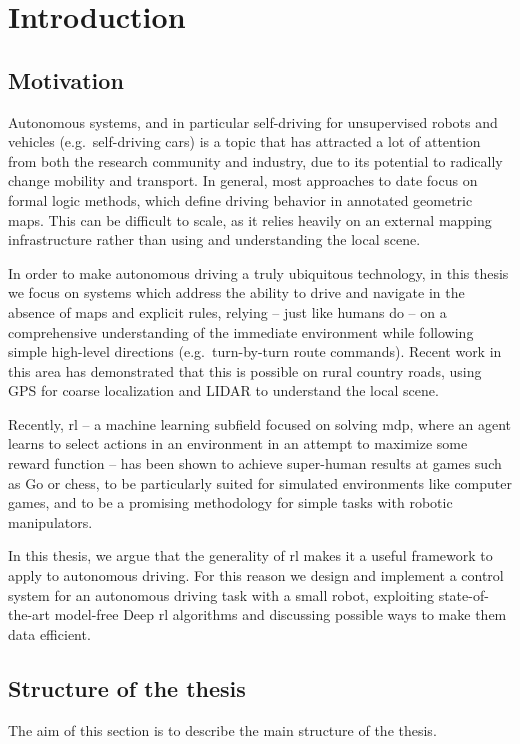 \chapter{Introduction}

\section{Motivation}

Autonomous systems, and in particular self-driving for unsupervised robots and vehicles (e.g.\ self-driving cars) is a topic that has attracted a lot of attention from both the research community and industry, due to its potential to radically change mobility and transport. In general, most approaches to date focus on formal logic methods, which define driving behavior in annotated geometric maps. This can be difficult to scale, as it relies heavily on an external mapping infrastructure rather than using and understanding the local scene.

In order to make autonomous driving a truly ubiquitous technology, in this thesis we focus on systems which address the ability to drive and navigate in the absence of maps and explicit rules, relying – just like humans do – on a comprehensive understanding of the immediate environment while following simple high-level directions (e.g.\ turn-by-turn route commands). Recent work in this area has demonstrated that this is possible on rural country roads, using GPS for coarse localization and LIDAR to understand the local scene. 

Recently, \gls{rl} – a machine learning subfield focused on solving \gls{mdp}, where an agent learns to select actions in an environment in an attempt to maximize some reward function – has been shown to achieve super-human results at games such as Go or chess, to be particularly suited for simulated environments like computer games, and to be a promising methodology for simple tasks with robotic manipulators.

In this thesis, we argue that the generality of \gls{rl} makes it a useful framework to apply to autonomous driving. 
For this reason we design and implement a control system for an autonomous driving task with a small robot, exploiting state-of-the-art model-free Deep \gls{rl} algorithms and discussing possible ways to make them data efficient.

\section{Structure of the thesis}
The aim of this section is to describe the main structure of the thesis.

